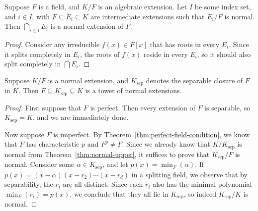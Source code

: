 \begin{lemma}\label{lem:normal-intersection}
    Suppose \(F\) is a field, and \(K/F\) is an algebraic extension.
    Let \(I\) be some index set, and \(i \in I\),
    with \(F \subseteq E_i \subseteq K\) are intermediate extensions
    such that \(E_i/F\) is normal.
    Then \(\bigcap_{i \in I} E_i\) is a normal extension of \(F\).
\end{lemma}
\begin{proof}
    Consider any irreducible \(f(x) \in F[x]\) that has roots in every \(E_i\).
    Since it splits completely in \(E_i\), the roots of \(f(x)\) reside in every \(E_i\),
    so it should also split completely in \(\bigcap E_i\).
\end{proof}
\begin{lemma}
    Suppose \(K/F\) is a normal extension,
    and \(K_\text{sep}\) denotes the separable closure of \(F\) in \(K\).
    Then \(F \subseteq K_\text{sep} \subseteq K\) is a tower of normal extensions.
\end{lemma}
\begin{proof}
    First suppose that \(F\) is perfect.
    Then every extension of \(F\) is separable, so \(K_\text{sep} = K\),
    and we are immediately done.

    Now suppose \(F\) is imperfect.
    By Theorem~\ref{thm:perfect-field-condition},
    we know that \(F\) has characteristic \(p\) and \(F^p \neq F\).
    Since we already know that \(K/K_\text{sep}\) is normal from Theorem~\ref{thm:normal-upper},
    it suffices to prove that \(K_\text{sep}/F\) is normal.
    Consider some \(\alpha \in K_\text{sep}\), and let \(p(x) = \min_F(\alpha)\).
    If \(p(x) = (x-\alpha)(x-r_2)\cdots(x-r_d)\) in a splitting field,
    we observe that by separability, the \(r_i\) are all distinct.
    Since each \(r_i\) also has the minimal polynomial \(\min_F(r_i) = p(x)\),
    we conclude that they all lie in \(K_\text{sep}\),
    so indeed \(K_\text{sep}/K\) is normal.
\end{proof}

